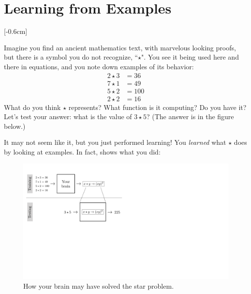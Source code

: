 
\section{Learning from Examples}
[-0.6cm]


Imagine you find an ancient mathematics text, with marvelous looking proofs, but there is a symbol you do not recognize, ``$\star$". You see it being used here and there in equations, and you note down examples of its behavior:
\begin{align}
    2 \star 3 &= 36\nonumber \\
    7 \star 1 &= 49\nonumber \\
    5 \star 2 &= 100\nonumber \\
    2 \star 2 &= 16\nonumber
\end{align}
What do you think $\star$ represents? What function is it computing? Do you have it? Let's test your answer: what is the value of $3 \star 5$? (The answer is in the figure below.)

It may not seem like it, but you just performed learning! You \emph{learned} what $\star$ does by looking at examples. In fact, \fig{\ref{fig:star_symbol_learning}} shows what you did:

\begin{figure}[h]
    \centerline{
    \includegraphics[width=0.75\linewidth]{./figures/intro_to_learning/star_symbol_learning.pdf}
    }
    \caption{How your brain may have solved the star problem.}
    \label{fig:star_symbol_learning}
\end{figure}

